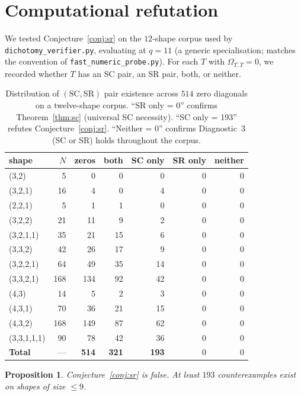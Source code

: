 \documentclass[11pt]{article}
\newtheorem{proposition}[theorem]{Proposition}
\theoremstyle{definition}
\newcommand{\Om}{\Omega}
\begin{document}
\section{Computational refutation}

We tested Conjecture~\ref{conj:sr} on the $12$-shape corpus used by
\texttt{dichotomy\_verifier.py}, evaluating at $q = 11$ (a generic
specialisation; matches the convention of
\texttt{fast\_numeric\_probe.py}). For each $T$ with $\Om_{T,T} = 0$, we
recorded whether $T$ has an SC pair, an SR pair, both, or neither.

\begin{table}[h]
\centering
\begin{tabular}{lrrrrrr}
\toprule
shape & $N$ & zeros & both & SC only & SR only & neither \\
\midrule
(3,2)         & 5   & 0   & 0   & 0   & 0 & 0 \\
(3,2,1)       & 16  & 4   & 0   & 4   & 0 & 0 \\
(2,2,1)       & 5   & 1   & 1   & 0   & 0 & 0 \\
(3,2,2)       & 21  & 11  & 9   & 2   & 0 & 0 \\
(3,2,1,1)     & 35  & 21  & 15  & 6   & 0 & 0 \\
(3,3,2)       & 42  & 26  & 17  & 9   & 0 & 0 \\
(3,2,2,1)     & 64  & 49  & 35  & 14  & 0 & 0 \\
(3,3,2,1)     & 168 & 134 & 92  & 42  & 0 & 0 \\
(4,3)         & 14  & 5   & 2   & 3   & 0 & 0 \\
(4,3,1)       & 70  & 36  & 21  & 15  & 0 & 0 \\
(4,3,2)       & 168 & 149 & 87  & 62  & 0 & 0 \\
(3,3,1,1,1)   & 90  & 78  & 42  & 36  & 0 & 0 \\
\midrule
\textbf{Total} & --- & \textbf{514} & \textbf{321} & \textbf{193} & 0 & 0 \\
\bottomrule
\end{tabular}
\caption{Distribution of $(\text{SC}, \text{SR})$ pair existence across
$514$ zero diagonals on a twelve-shape corpus. ``SR only = 0'' confirms
Theorem~\ref{thm:sc} (universal SC necessity). ``SC only = 193''
refutes Conjecture~\ref{conj:sr}. ``Neither = 0'' confirms Diagnostic~3
(SC or SR) holds throughout the corpus.}
\label{tab:results}
\end{table}

\begin{proposition}
Conjecture~\ref{conj:sr} is false. At least $193$ counterexamples exist
on shapes of size $\le 9$.
\end{proposition}
\end{document}
